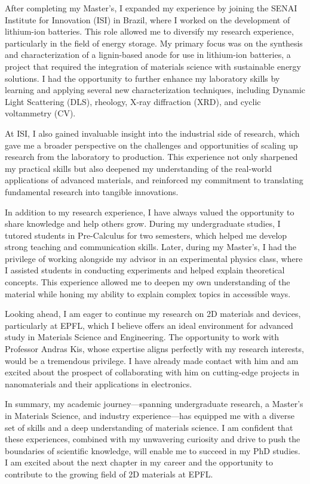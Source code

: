 \documentclass{article}
\begin{document}
After completing my Master's, I expanded my experience by joining the SENAI Institute for Innovation (ISI) in Brazil, where I worked on the development of lithium-ion batteries. This role allowed me to diversify my research experience, particularly in the field of energy storage. My primary focus was on the synthesis and characterization of a lignin-based anode for use in lithium-ion batteries, a project that required the integration of materials science with sustainable energy solutions. I had the opportunity to further enhance my laboratory skills by learning and applying several new characterization techniques, including Dynamic Light Scattering (DLS), rheology, X-ray diffraction (XRD), and cyclic voltammetry (CV).

At ISI, I also gained invaluable insight into the industrial side of research, which gave me a broader perspective on the challenges and opportunities of scaling up research from the laboratory to production. This experience not only sharpened my practical skills but also deepened my understanding of the real-world applications of advanced materials, and reinforced my commitment to translating fundamental research into tangible innovations.

In addition to my research experience, I have always valued the opportunity to share knowledge and help others grow. During my undergraduate studies, I tutored students in Pre-Calculus for two semesters, which helped me develop strong teaching and communication skills. Later, during my Master's, I had the privilege of working alongside my advisor in an experimental physics class, where I assisted students in conducting experiments and helped explain theoretical concepts. This experience allowed me to deepen my own understanding of the material while honing my ability to explain complex topics in accessible ways.

Looking ahead, I am eager to continue my research on 2D materials and devices, particularly at EPFL, which I believe offers an ideal environment for advanced study in Materials Science and Engineering. The opportunity to work with Professor Andras Kis, whose expertise aligns perfectly with my research interests, would be a tremendous privilege. I have already made contact with him and am excited about the prospect of collaborating with him on cutting-edge projects in nanomaterials and their applications in electronics.

In summary, my academic journey—spanning undergraduate research, a Master’s in Materials Science, and industry experience—has equipped me with a diverse set of skills and a deep understanding of materials science. I am confident that these experiences, combined with my unwavering curiosity and drive to push the boundaries of scientific knowledge, will enable me to succeed in my PhD studies. I am excited about the next chapter in my career and the opportunity to contribute to the growing field of 2D materials at EPFL.
\vspace{0.125in}


\end{document}
